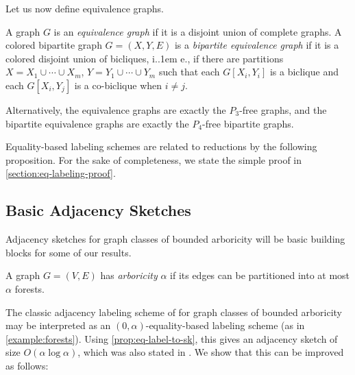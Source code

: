 \documentclass{theoretics}
\makeatletter
\newcommand{\cF}{\ensuremath{\mathcal{F}}}
\newcommand{\Adj}{\textsc{Adj}}
\newcommand*\ie{i.\kern.1em e.\@\xspace} %
\newcommand\IfRestateTF{%
  \ifx\label\thmt@gobble@label %
    \expandafter\@firstoftwo
  \else
    \expandafter\@secondoftwo
  \fi
}
\newcommand{\RestateRemark}{\IfRestateTF{{\normalfont\bfseries (Restated) }}{}}
\makeatother
\begin{document}
Let us now define equivalence graphs.
\begin{definition}
	A graph $G$ is an \emph{equivalence graph} if it is a disjoint union of complete graphs.  A colored bipartite graph $G =
	(X,Y,E)$ is a \emph{bipartite equivalence graph} if it is a colored disjoint union of bicliques, \ie, 
	if there are partitions $X = X_1 \cup \dotsm \cup X_m$, $Y = Y_1 \cup \dotsm \cup Y_m$ such that each
	$G[X_i,Y_i]$ is a biclique and each $G[X_i,Y_j]$ is a co-biclique when $i \neq j$.

  Alternatively, the equivalence graphs are exactly the $P_3$-free graphs, and the bipartite
  equivalence graphs are exactly the $P_4$-free bipartite graphs. 
\end{definition}

Equality-based labeling schemes are related to reductions by the following proposition. For the sake
of completeness, we state the simple proof in \cref{section:eq-labeling-proof}.



\subsection{Basic Adjacency Sketches}
\label{sec:bounded-arboricity}

Adjacency sketches for graph classes of bounded arboricity will be basic building blocks for some
of our results.
\begin{definition}
A graph $G = (V,E)$ has \emph{arboricity} $\alpha$ if its edges can be partitioned into at most
$\alpha$ forests.
\end{definition}
The classic adjacency labeling scheme of \cite{KNR92} for graph classes of bounded arboricity may be
interpreted as an $(0,\alpha)$-equality-based labeling scheme (as in \cref{example:forests}).
Using \cref{prop:eq-label-to-sk}, this gives an adjacency sketch of size $O(\alpha \log \alpha)$,
which was also stated in \cite{Har20}. We show that this can be improved as follows:
\end{document}
